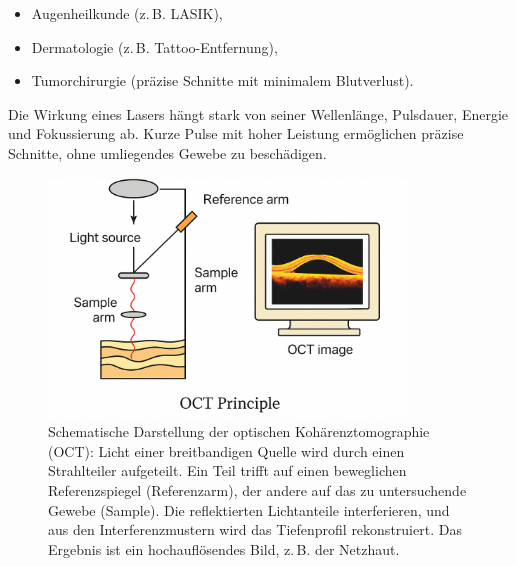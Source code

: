 \begin{itemize}
	\item Augenheilkunde (z.\,B. LASIK),
	\item Dermatologie (z.\,B. Tattoo-Entfernung),
	\item Tumorchirurgie (präzise Schnitte mit minimalem Blutverlust).
\end{itemize}

\begin{tcolorbox}[hinweisbox, title=Laserparameter]
	\label{box:laserparameter}
	\small
	Die Wirkung eines Lasers hängt stark von seiner Wellenlänge, Pulsdauer, Energie und Fokussierung ab. Kurze Pulse mit hoher Leistung ermöglichen präzise Schnitte, ohne umliegendes Gewebe zu beschädigen.
\end{tcolorbox}

\begin{figure}[H]
	\centering
	\includegraphics[width=0.85\textwidth]{bilder/oct.png}
	\caption{Schematische Darstellung der optischen Kohärenztomographie (OCT): Licht einer breitbandigen Quelle wird durch einen Strahlteiler aufgeteilt. Ein Teil trifft auf einen beweglichen Referenzspiegel (Referenzarm), der andere auf das zu untersuchende Gewebe (Sample). Die reflektierten Lichtanteile interferieren, und aus den Interferenzmustern wird das Tiefenprofil rekonstruiert. Das Ergebnis ist ein hochauflösendes Bild, z.\,B. der Netzhaut.}
	\label{fig:oct_prinzip}
\end{figure}

